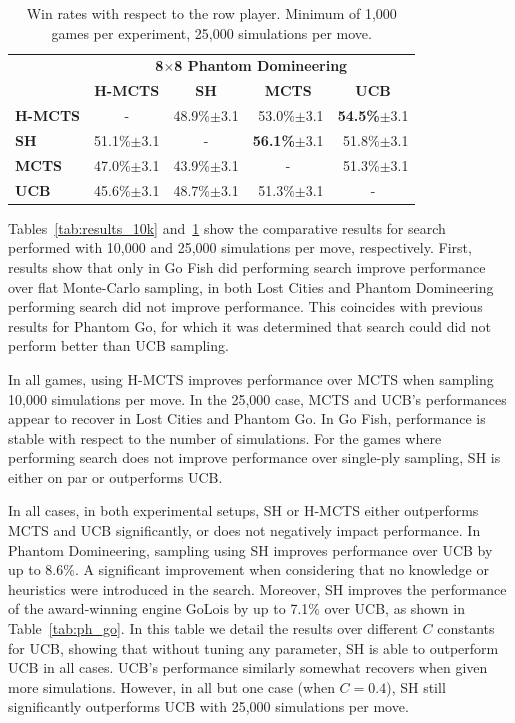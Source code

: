 \documentclass[a4paper]{llncs}
\begin{document}
\begin{table}[ht]
\begin{tabular}{@{}lrrrr@{}}
\toprule
& \multicolumn{4}{c}{\textbf{8$\times$8 Phantom Domineering}}       \\
& \multicolumn{1}{c}{\textbf{H-MCTS}} & \multicolumn{1}{c}{\textbf{SH}} & \multicolumn{1}{c}{\textbf{MCTS}} & \multicolumn{1}{c}{\textbf{UCB}} \\ [1mm] \cmidrule(l){2-5} 
\textbf{H-MCTS} & \multicolumn{1}{c}{-}		& 48.9\%$\pm$3.1			& 53.0\%$\pm$3.1 			& \textbf{54.5\%}$\pm$3.1 		\\[.5mm] 
\textbf{SH}     & 51.1\%$\pm$3.1			& \multicolumn{1}{c}{-}		& \textbf{56.1\%}$\pm$3.1	& 51.8\%$\pm$3.1		 		\\[.5mm] 
\textbf{MCTS}   & 47.0\%$\pm$3.1			& 43.9\%$\pm$3.1			& \multicolumn{1}{c}{-} 	& 51.3\%$\pm$3.1  				\\[.5mm] 
\textbf{UCB}	& 45.6\%$\pm$3.1			& 48.7\%$\pm$3.1			& 51.3\%$\pm$3.1			& \multicolumn{1}{c}{-} 		\\[.5mm] \bottomrule
\end{tabular}

\vspace{2mm}
{\caption{Win rates with respect to the row player. Minimum of 1,000 games per experiment, 25,000 simulations per move.} \label{tab:results_25k}}
\end{table}

Tables~\ref{tab:results_10k} and~\ref{tab:results_25k} show the comparative results for search performed with 10,000 and 25,000 simulations per move, respectively. First, results show that only in Go Fish did performing search improve performance over flat Monte-Carlo sampling, in both Lost Cities and Phantom Domineering performing search did not improve performance. This coincides with previous results for Phantom Go, for which it was determined that search could did not perform better than UCB sampling. 

In all games, using H-MCTS improves performance over MCTS when sampling 10,000 simulations per move. In the 25,000 case, MCTS and UCB's performances appear to recover in Lost Cities and Phantom Go. In Go Fish, performance is stable with respect to the number of simulations. For the games where performing search does not improve performance over single-ply sampling, SH is either on par or outperforms UCB.

In all cases, in both experimental setups, SH or H-MCTS either outperforms MCTS and UCB significantly, or does not negatively impact performance. In Phantom Domineering, sampling using SH improves performance over UCB by up to 8.6\%. A significant improvement when considering that no knowledge or heuristics were introduced in the search. Moreover, SH improves the performance of the award-winning engine {\sc GoLois} by up to 7.1\% over UCB, as shown in Table~\ref{tab:ph_go}. In this table we detail the results over different $C$ constants for UCB, showing that without tuning any parameter, SH is able to outperform UCB in all cases. UCB's performance similarly somewhat recovers when given more simulations. However, in all but one case (when $C=0.4$), SH still significantly outperforms UCB with 25,000 simulations per move.
\end{document}
